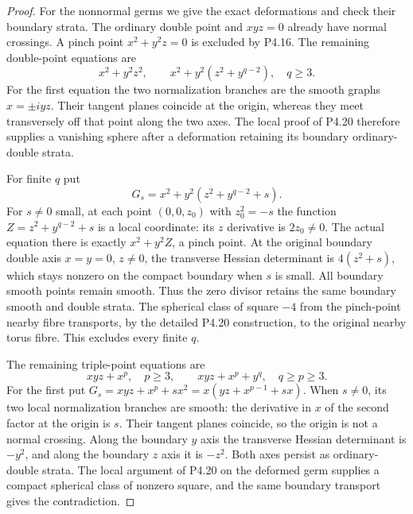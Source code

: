 \begin{proof}
For the nonnormal germs we give the exact
deformations and check their boundary strata.
The ordinary double point and $xyz=0$
already have normal crossings. A pinch point
$x^2+y^2z=0$ is excluded by P4.16.
The remaining double-point equations are
\[
 x^2+y^2z^2,\qquad
 x^2+y^2(z^2+y^{q-2}),\quad q\ge3.
\]
For the first equation the two normalization
branches are the smooth graphs $x=\pm i yz$.
Their tangent planes coincide at the origin,
whereas they meet transversely off that point
along the two axes. The local proof of P4.20
therefore supplies a vanishing sphere after
a deformation retaining its boundary
ordinary-double strata.

For finite $q$ put
\[
 G_s=x^2+y^2(z^2+y^{q-2}+s).
\]
For $s\ne0$ small, at each point
$(0,0,z_0)$ with $z_0^2=-s$ the function
$Z=z^2+y^{q-2}+s$ is a local coordinate:
its $z$ derivative is $2z_0\ne0$.
The actual equation there is exactly
$x^2+y^2Z$, a pinch point. At the original
boundary double axis $x=y=0$, $z\ne0$,
the transverse Hessian determinant is
$4(z^2+s)$, which stays nonzero on the
compact boundary when $s$ is small.
All boundary smooth points remain smooth.
Thus the zero divisor retains the same
boundary smooth and double strata.
The spherical class of square $-4$
from the pinch-point nearby fibre transports,
by the detailed P4.20 construction, to
the original nearby torus fibre.
This excludes every finite $q$.

The remaining triple-point equations are
\[
 xyz+x^p,\quad p\ge3,\qquad
 xyz+x^p+y^q,\quad q\ge p\ge3.
\]
For the first put
$G_s=xyz+x^p+s x^2
=x(yz+x^{p-1}+s x)$.
When $s\ne0$, its two local normalization
branches are smooth: the derivative in $x$
of the second factor at the origin is $s$.
Their tangent planes coincide, so the
origin is not a normal crossing. Along
the boundary $y$ axis the transverse
Hessian determinant is $-y^2$, and along
the boundary $z$ axis it is $-z^2$.
Both axes persist as ordinary-double
strata. The local argument of P4.20 on
the deformed germ supplies a compact
spherical class of nonzero square, and
the same boundary transport gives the
contradiction.


\end{proof}
